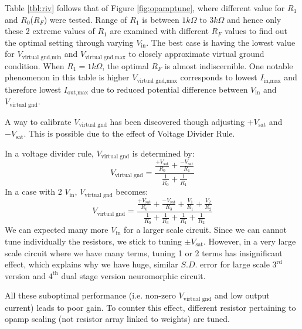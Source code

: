 Table \ref{tbl:riv} follows that of Figure \ref{fig:opamptune}, where different value for $R_1$ and $R_0$($R_F$) were tested. Range of $R_1$ is between $1k\Omega$ to $3k\Omega$ and hence only these 2 extreme values of $R_1$ are examined with different $R_F$ values to find out the optimal setting through varying $V_{\text{in}}$. The best case is having the lowest value for $V_{\text{virtual gnd,min}}$ and $V_{\text{virtual gnd,max}}$ to closely approximate virtual ground condition. When $R_1=1k\Omega$, the optimal $R_F$ is almost indiscernible. One notable phenomenon in this table is higher $V_{\text{virtual gnd,max}}$ corresponds to lowest $I_{\text{in,max}}$ and therefore lowest $I_{\text{out,max}}$ due to reduced potential difference between $V_{\text{in}}$ and $V_{\text{virtual gnd}}$.

A way to calibrate $V_{\text{virtual gnd}}$ has been discovered though adjusting $+V_{\text{sat}}$ and $-V_{\text{sat}}$. This is possible due to the effect of Voltage Divider Rule.

In a voltage divider rule, $V_{\text{virtual gnd}}$ is determined by:
$$V_{\text{virtual gnd}}=\frac{\frac{+V_{\text{sat}}}{R_0}+\frac{-V_{\text{sat}}}{R_1}}{\frac{1}{R_0}+\frac{1}{R_1}}$$
In a case with 2 $V_{\text{in}}$, $V_{\text{virtual gnd}}$ becomes:
$$V_{\text{virtual gnd}}=\frac{\frac{+V_{\text{sat}}}{R_0}+\frac{-V_{\text{sat}}}{R_3}+\frac{V_1}{R_1}+\frac{V_2}{R_2}}{\frac{1}{R_0}+\frac{1}{R_3}+\frac{1}{R_1}+\frac{1}{R_2}}$$
We can expected many more $V_{\text{in}}$ for a larger scale circuit. Since we can cannot tune individually the resistors, we stick to tuning $\pm V_{\text{sat}}$. However, in a very large scale circuit where we have many terms, tuning 1 or 2 terms has insignificant effect, which explains why we have huge, similar $S.D.$ error for large scale $\text{3}^{\text{rd}}$ version and $\text{4}^{\text{th}}$ dual stage version neuromorphic circuit.

All these suboptimal performance (i.e. non-zero $V_{\text{virtual gnd}}$ and low output current) leads to poor gain. To counter this effect, different resistor pertaining to opamp scaling (not resistor array linked to weights) are tuned.

